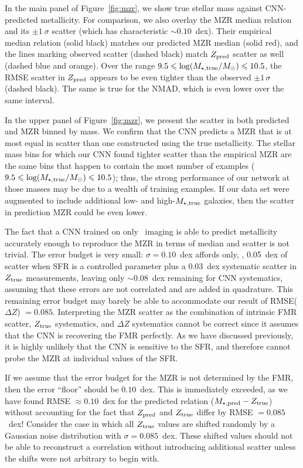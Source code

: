 \documentclass[fleqn,usenatbib]{mnras}
\begin{document}
In the main panel of Figure~\ref{fig:mzr}, we show true stellar mass against CNN-predicted metallicity. For comparison, we also overlay the \cite{Tremonti2004} MZR median relation and its $\pm 1~\sigma$ scatter (which has characteristic $\sim 0.10$~dex). Their empirical median relation (solid black) matches our predicted MZR median (solid red), and the lines marking observed scatter (dashed black) match $Z_{\rm pred}$ scatter as well (dashed blue and orange). Over the range $9.5 \leqslant \log (M_{\star, \rm true}/\hbox{$M_\odot$}) \leqslant 10.5$, the RMSE scatter in $Z_{\rm pred}$ appears to be even tighter than the observed $\pm 1\,\sigma$ (dashed black). The same is true for the NMAD, which is even lower over the same interval.

In the upper panel of Figure~\ref{fig:mzr}, we present the scatter in both predicted and \cite{Tremonti2004} MZR binned by mass. We confirm that the CNN predicts a MZR that is at most equal in scatter than one constructed using the true metallicity. The stellar mass bins for which our CNN found tighter scatter than the empirical MZR are the same bins that happen to contain the most number of examples ($9.5 \leqslant \log (M_{\star, \rm true}/\hbox{$M_\odot$}) \leqslant 10.5$); thus, the strong performance of our network at those masses may be due to a wealth of training examples.
If our data set were augmented to include additional low- and high-$M_{\rm \star,true}$ galaxies, then the scatter in prediction MZR could be even lower.

The fact that a CNN trained on only \sdssg\sdssr\sdssi\ imaging is able to predict metallicity accurately enough to reproduce the MZR in terms of median and scatter is not trivial. The error budget is very small: $\sigma = 0.10$~dex affords only, \eg, 0.05~dex of scatter when SFR is a controlled parameter plus a 0.03~dex systematic scatter in $Z_{\rm true}$ measurements, leaving only $\sim 0.08$~dex remaining for CNN systematics, assuming that these errors are not correlated and are added in quadrature. This remaining error budget may barely be able to accommodate our result of RMSE($\Delta Z$) $= 0.085$.
Interpreting the MZR scatter as the combination of intrinsic FMR scatter, $Z_{\rm true}$ systematics, and $\Delta Z$ systematics cannot be correct since it assumes that the CNN is recovering the FMR perfectly.
As we have discussed previously, it is highly unlikely that the CNN is sensitive to the SFR, and therefore cannot probe the MZR at individual values of the SFR.

If we assume that the error budget for the MZR is not determined by the FMR, then the error ``floor'' should be $0.10$~dex.
This is immediately exceeded, as we have found RMSE $\approx 0.10$~dex for the predicted relation ($M_{\star,\rm pred}-Z_{\rm true}$) without accounting for the fact that $Z_{\rm pred}$ and $Z_{\rm true}$ differ by RMSE $= 0.085$~dex!
Consider the case in which all $Z_{\rm true}$ values are shifted randomly by a Gaussian noise distribution with $\sigma = 0.085$~dex.
These shifted values should not be able to reconstruct a correlation without introducing additional scatter unless the shifts were not arbitrary to begin with.
\end{document}

